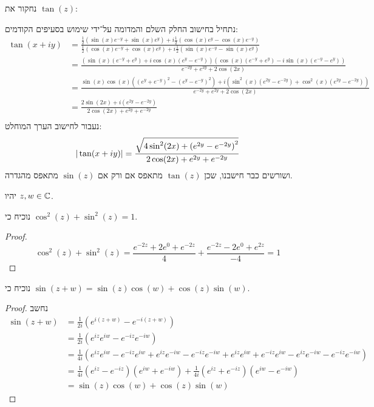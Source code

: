 \Subquestion{}
נחקור את $\tan(z)$:
\begin{solution}
	נתחיל בחישוב החלק השלם והמדומה על־ידי שימוש בסעיפים הקודמים:
	\begin{align*}
		\tan(x + i y)
		& = \frac{\frac{1}{2}(\sin(x) e^{-y} + \sin(x) e^{y}) + i\frac{1}{2}(\cos(x) e^{y} - \cos(x) e^{-y})}{\frac{1}{2}(\cos(x) e^{-y} + \cos(x) e^{y}) + i \frac{1}{2}(\sin(x) e^{-y} - \sin(x) e^{y})} \\
		& = \frac{(\sin(x) (e^{-y} + e^{y}) + i \cos(x) (e^{y} - e^{-y}))(\cos(x) (e^{-y} + e^{y}) - i \sin(x) (e^{-y} - e^{y}))}{e^{-2y} + e^{2y} + 2\cos(2x)} \\
		& = \frac{\sin(x)\cos(x)({(e^y + e^{-y})}^2 - {(e^y - e^{-y})}^2) + i( \sin^2(x)(e^{2y} - e^{-2y}) + \cos^2(x) (e^{2y} - e^{-2y}) )}{e^{-2y} + e^{2y} + 2\cos(2x)} \\
		& = \frac{2\sin(2x) + i(e^{2y} - e^{-2y})}{2\cos(2x) + e^{2y} + e^{-2y}} \\
	\end{align*}
	נעבור לחישוב הערך המוחלט:
	\[
		|\tan(x + iy)|
		= \frac{\sqrt{4\sin^2(2x) + {(e^{2y} - e^{-2y})}^2}}{2\cos(2x) + e^{2y} + e^{-2y}} \\
	\]
	ושורשים כבר חישבנו, שכן $\tan(z)$ מתאפס אם ורק אם $\sin(z)$ מתאפס מהגדרה.
\end{solution}

\Question{}
יהיו $z, w \in \mathbb{C}$.

\Subquestion{}
נוכיח כי $\cos^2(z) + \sin^2(z) = 1$.
\begin{proof}
	\[
		\cos^2(z) + \sin^2(z)
		= \frac{e^{-2z} + 2 e^{0} + e^{-2z}}{4} + \frac{e^{-2z} - 2 e^{0} + e^{2z}}{-4}
		= 1
	\]
\end{proof}

\Subquestion{}
נוכיח כי $\sin(z + w) = \sin(z) \cos(w) + \cos(z) \sin(w)$.
\begin{proof}
	נחשב
	\begin{align*}
		\sin(z + w)
		& = \frac{1}{2i}(e^{i(z + w)} - e^{-i(z + w)}) \\
		& = \frac{1}{2i}(e^{iz} e^{iw} - e^{-iz} e^{-iw}) \\
		& = \frac{1}{4i}(e^{iz} e^{iw} - e^{-iz} e^{iw} + e^{iz} e^{-iw} - e^{-iz} e^{-iw} + e^{iz} e^{iw} + e^{-iz} e^{iw} - e^{iz} e^{-iw} - e^{-iz} e^{-iw}) \\
		& = \frac{1}{4i}(e^{iz} - e^{-iz})(e^{iw} + e^{-iw}) + \frac{1}{4i}(e^{iz} + e^{-iz})(e^{iw} - e^{-iw}) \\
		& = \sin(z) \cos(w) + \cos(z) \sin(w)
	\end{align*}
\end{proof}

